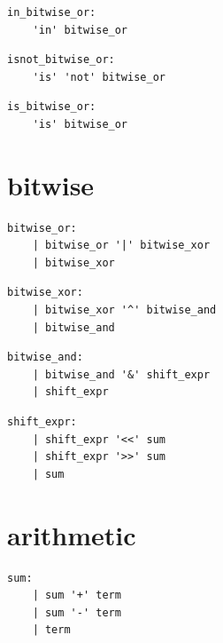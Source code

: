 \noindent\textbf{\texttt{}}\par
\begin{lstlisting}
in_bitwise_or:
    'in' bitwise_or
\end{lstlisting}

\noindent\textbf{\texttt{}}\par
\begin{lstlisting}
isnot_bitwise_or:
    'is' 'not' bitwise_or
\end{lstlisting}

\noindent\textbf{\texttt{}}\par
\begin{lstlisting}
is_bitwise_or:
    'is' bitwise_or
\end{lstlisting}

\section{bitwise}

\noindent\textbf{\texttt{}}\par
\begin{lstlisting}
bitwise_or:
    | bitwise_or '|' bitwise_xor
    | bitwise_xor
\end{lstlisting}

\noindent\textbf{\texttt{}}\par
\begin{lstlisting}
bitwise_xor:
    | bitwise_xor '^' bitwise_and
    | bitwise_and
\end{lstlisting}

\noindent\textbf{\texttt{}}\par
\begin{lstlisting}
bitwise_and:
    | bitwise_and '&' shift_expr
    | shift_expr
\end{lstlisting}

\noindent\textbf{\texttt{}}\par
\begin{lstlisting}
shift_expr:
    | shift_expr '<<' sum
    | shift_expr '>>' sum
    | sum
\end{lstlisting}

\section{arithmetic}

\noindent\textbf{\texttt{}}\par
\begin{lstlisting}
sum:
    | sum '+' term
    | sum '-' term
    | term
\end{lstlisting}

